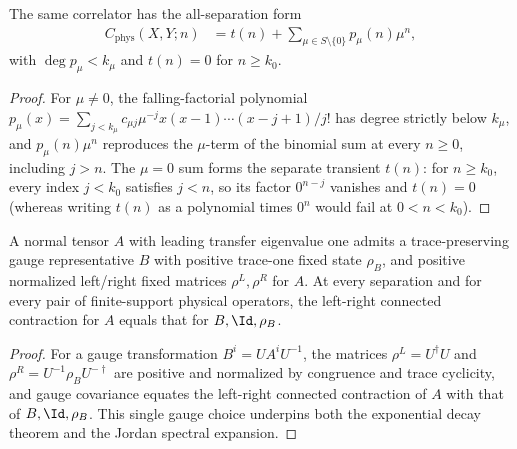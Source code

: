 \begin{lemma}
    \label{thm:physical_correlator_jordan_transient}
    \leanok
    The same correlator has the all-separation form
    \begin{align}
        C_{\mathrm{phys}}(X,Y;n)
         & =t(n)+\sum_{\mu\in S\setminus\{0\}}p_\mu(n)\mu^n,
        \label{eq:physical_correlator_jordan_transient}
    \end{align}
    with $\deg p_\mu<k_\mu$ and $t(n)=0$ for $n\ge k_0$.
\end{lemma}
\begin{proof}
    \leanok
    For $\mu\ne0$, the falling-factorial polynomial
    $p_\mu(x)=\sum_{j<k_\mu}c_{\mu j}\mu^{-j}
        x(x-1)\cdots(x-j+1)/j!$ has degree strictly below $k_\mu$, and
    $p_\mu(n)\mu^n$ reproduces the $\mu$-term of the binomial sum at every
    $n\ge0$, including $j>n$.
    The $\mu=0$ sum forms the separate transient $t(n)$: for $n\ge k_0$, every
    index $j<k_0$ satisfies $j<n$, so its factor $0^{n-j}$ vanishes and
    $t(n)=0$ (whereas writing $t(n)$ as a polynomial times $0^n$ would fail at
    $0<n<k_0$).
\end{proof}

\begin{lemma}
    \label{lem:physical_correlation_normal_gauge}
    \leanok
    A normal tensor $A$ with leading transfer eigenvalue one admits a
    trace-preserving gauge representative $B$
    with positive trace-one fixed state $\rho_B$, and positive normalized
    left/right fixed matrices $\rho^L,\rho^R$ for $A$. At every separation
    and for every pair of finite-support physical operators, the left-right
    connected contraction for $A$ equals that for $B,\Id,\rho_B$.
\end{lemma}
\begin{proof}
    \leanok
    For a gauge transformation $B^i=UA^iU^{-1}$, the matrices
    $\rho^L=U^\dagger U$ and $\rho^R=U^{-1}\rho_B U^{-\dagger}$ are positive
    and normalized by congruence and trace cyclicity, and gauge covariance
    equates the left-right connected contraction of $A$ with that of
    $B,\Id,\rho_B$. This single gauge choice underpins both the exponential
    decay theorem and the Jordan spectral expansion.
\end{proof}

